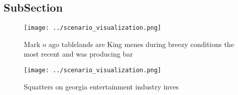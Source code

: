 \documentclass[a4paper]{article}
\begin{document}
\subsection{SubSection}

\begin{figure}
\centering
\texttt{[image: ../scenario\_visualization.png]}
\caption{Mark o ago tablelands are King menes during breezy conditions the most recent and was producing bar
}
\end{figure}
 
\begin{figure}
\centering
\texttt{[image: ../scenario\_visualization.png]}
\caption{Squatters on georgia entertainment industry inves
}
\end{figure}
 
\end{document}
